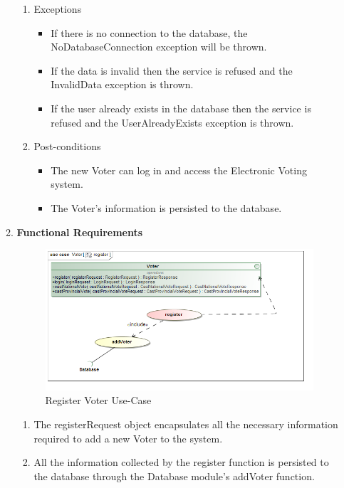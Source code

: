 \begin{enumerate}
\begin{enumerate}
\begin{enumerate}
					\item Exceptions
					\begin{itemize}
						\item If there is no connection to the database, the NoDatabaseConnection exception will be thrown.
						\item If the data is invalid then the service is refused and the InvalidData exception is thrown.
						\item If the user already exists in the database then the service is refused and the UserAlreadyExists exception is thrown.
					\end{itemize}
					
					\item Post-conditions
					\begin{itemize}
						\item The new Voter can log in and access the Electronic Voting system. 
						\item The Voter’s information is persisted to the database.
					\end{itemize}
				\end{enumerate}
			
			\item \textbf{Functional Requirements}
				\begin{figure}[H]
					\centering
					\includegraphics[width=0.75\linewidth]{../Images/Voter/UseCases/register_useCase.png}
					\caption{Register Voter Use-Case}
				\end{figure}
				
				\begin{enumerate}
					\item The registerRequest object encapsulates all the necessary information required to add a new Voter to the system. 
					\item All the information collected by the register function is persisted to the database through the Database module's addVoter function. 
				\end{enumerate}
				

\end{enumerate}
\end{enumerate}
